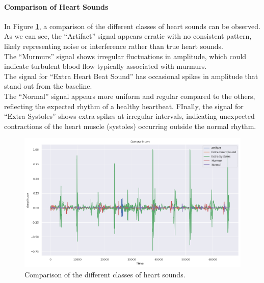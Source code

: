 \paragraph{Comparison of Heart Sounds}
In Figure \ref{fig:comparison_heart_beat_audio}, a comparison of the different classes of heart sounds can be observed.\\
As we can see, the “Artifact” signal appears erratic with no consistent pattern, likely representing noise or interference rather than true heart sounds.\\
The “Murmurs” signal shows irregular fluctuations in amplitude, which could indicate turbulent blood flow typically associated with murmurs. \\
The signal for “Extra Heart Beat Sound” has occasional spikes in amplitude that stand out from the baseline.\\
The “Normal” signal appears more uniform and regular compared to the others, reflecting the expected rhythm of a healthy heartbeat.
FInally, the signal for “Extra Systoles” shows extra spikes at irregular intervals,
indicating unexpected contractions of the heart muscle (systoles) occurring outside the normal rhythm.

\begin{figure}[H]
    \centering
    \includegraphics[width=.8\columnwidth]{../images/comparison_heart_beat_audio.png}
    \caption{Comparison of the different classes of heart sounds.}
    \label{fig:comparison_heart_beat_audio}
\end{figure}

